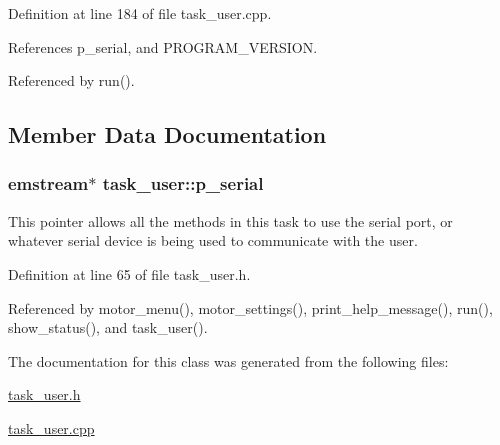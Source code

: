 Definition at line 184 of file task\+\_\+user.\+cpp.



References p\+\_\+serial, and P\+R\+O\+G\+R\+A\+M\+\_\+\+V\+E\+R\+S\+I\+O\+N.



Referenced by run().



\subsection{Member Data Documentation}
\hypertarget{classtask__user_a04ed5c2b4d7c9a1530bde6f217e01681}{
\subsubsection[{p\+\_\+serial}]{\setlength{\rightskip}{0pt plus 5cm}emstream$\ast$ task\+\_\+user\+::p\+\_\+serial\hspace{0.3cm}{\ttfamily [protected]}}}\label{classtask__user_a04ed5c2b4d7c9a1530bde6f217e01681}
This pointer allows all the methods in this task to use the serial port, or whatever serial device is being used to communicate with the user. 

Definition at line 65 of file task\+\_\+user.\+h.



Referenced by motor\+\_\+menu(), motor\+\_\+settings(), print\+\_\+help\+\_\+message(), run(), show\+\_\+status(), and task\+\_\+user().



The documentation for this class was generated from the following files\+:\begin{DoxyCompactItemize}
\item 
\hyperlink{task__user_8h}{task\+\_\+user.\+h}\item 
\hyperlink{task__user_8cpp}{task\+\_\+user.\+cpp}\end{DoxyCompactItemize}

